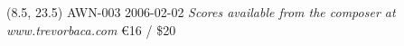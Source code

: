 \documentclass[10pt]{article}
\begin{document}


\begin{textblock}{7.5}(8.5, 23.5)
AWN-003 2006-02-02 \hfill
\textit{Scores available from the composer at www.trevorbaca.com} \hfill
\euro 16 / \$20
\end{textblock}
\end{document}
